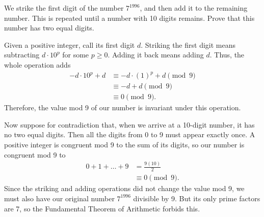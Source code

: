 \begin{problem}
We strike the first digit of the number $7^{1996}$, and then add it to the remaining number. This is repeated until a number with 10 digits remains. Prove that this number has
two equal digits.
\end{problem}

Given a positive integer, call its first digit $d$. Striking the first digit means subtracting $d \cdot 10^p$ for some $p \geq 0$. Adding it back means adding $d$. Thus, the whole operation adds 
\begin{align*}
-d \cdot 10^p + d &\equiv -d \cdot (1)^p + d \pmod 9 \\
&\equiv -d + d \pmod 9 \\
&\equiv 0 \pmod 9.
\end{align*} 
Therefore, the value mod 9 of our number is invariant under this operation.

Now suppose for contradiction that, when we arrive at a 10-digit number, it has no two equal digits. Then all the digits from 0 to 9 must appear exactly once. A positive integer is congruent mod 9 to the sum of its digits, so our number is congruent mod 9 to
\begin{align*}
0 + 1 + \dots + 9 &= \frac{9(10)}{2} \\
&\equiv 0 \pmod 9.
\end{align*}
Since the striking and adding operations did not change the value mod 9, we must also have our original number $7^{1996}$ divisible by 9. But its only prime factors are 7, so the Fundamental Theorem of Arithmetic forbids this.


